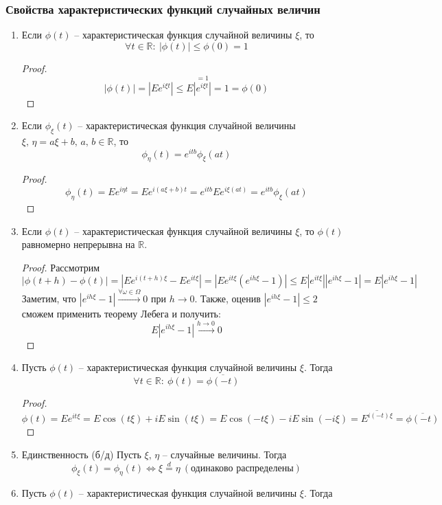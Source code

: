 \subsubsection*{Свойства характеристических функций случайных величин}
\begin{enumerate}
	\item Если $\phi(t)$ -- характеристическая функция случайной величины $\xi$, то
	      \[\forall t \in \mathbb{R} :\: |\phi(t)| \leq \phi(0) = 1\]
	      \begin{proof}
		      \[|\phi(t)| = |Ee^{i\xi t}| \leq E\stackrel{= 1}{|e^{i\xi t}|} = 1 = \phi(0)\]
	      \end{proof}
	\item Если $\phi_\xi(t)$ -- характеристическая функция случайной величины $\xi,\, \eta = a\xi + b,\, a,\, b \in \mathbb{R}$, то
	      \[\phi_\eta(t) = e^{itb}\phi_\xi(at)\]
	      \begin{proof}
		      \[\phi_\eta(t) = Ee^{i\eta t} = Ee^{i(a\xi + b)t} = e^{itb}Ee^{i\xi(at)} = e^{itb}\phi_\xi(at)\]
	      \end{proof}
	\item Если $\phi(t)$ -- характеристическая функция случайной величины $\xi$, то $\phi(t)$ равномерно непрерывна на $\mathbb{R}$.
	      \begin{proof}
		      Рассмотрим
		      \[|\phi(t + h) - \phi(t)| = |Ee^{i(t + h)\xi} - Ee^{it\xi}| = |Ee^{it\xi}(e^{ih\xi} - 1)| \leq E|e^{it\xi}||e^{ih\xi} - 1| = E|e^{ih\xi} - 1|\]
		      Заметим, что $|e^{ih\xi} - 1| \stackrel{\forall \omega \in \Omega}{\to} 0$ при $h \to 0$. Также, оценив $|e^{ih\xi} - 1| \leq 2$ сможем применить теорему Лебега и получить:
		      \[E|e^{ih\xi} - 1| \stackrel{h \to 0}{\to} 0\]
	      \end{proof}
	\item Пусть $\phi(t)$ -- характеристическая функция случайной величины $\xi$. Тогда
	      \[\forall t \in \mathbb{R}:\: \phi(t) = \overline{\phi(-t)}\]
	      \begin{proof}
		      \[\phi(t) = Ee^{it\xi} = E\cos(t\xi) + iE\sin(t\xi) = E\cos(-t\xi) - iE\sin(-i\xi) = \overline{E^{i(-t)\xi}} = \overline{\phi(-t)}\]
	      \end{proof}
	\item Единственность (б/д)
	      Пусть $\xi,\, \eta$ -- случайные величины. Тогда
	      \[\phi_\xi(t) = \phi_\eta(t) \Leftrightarrow \xi \stackrel{d}{=} \eta \: (\text{одинаково распределены})\]
	\item Пусть $\phi(t)$ -- характеристическая функция случайной величины $\xi$. Тогда

\end{enumerate}
